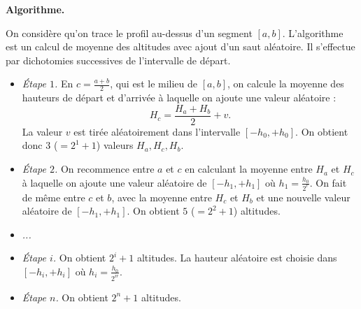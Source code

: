 \documentclass[11pt,class=report,crop=false]{standalone}
\begin{document}
\textbf{Algorithme.}

On considère qu'on trace le profil au-dessus d'un segment $[a,b]$.
L'algorithme est un calcul de moyenne des altitudes avec ajout d'un saut aléatoire.
Il s'effectue par dichotomies successives de l'intervalle de départ.

\begin{itemize}
  \item \emph{Étape $1$.} En $c=\frac{a+b}{2}$, qui est le milieu de $[a,b]$, on calcule la moyenne des hauteurs de départ et d'arrivée à laquelle on ajoute une valeur aléatoire :
$$H_c = \frac{H_a+H_b}{2} + v.$$
La valeur $v$ est tirée aléatoirement dans l'intervalle $[-h_0,+h_0]$.
On obtient donc $3$ ($=2^1+1$) valeurs $H_a,H_c,H_b$.



  \item \emph{Étape $2$.} On recommence entre $a$ et $c$ en calculant la moyenne entre $H_a$ et $H_c$ à laquelle on ajoute une valeur aléatoire de $[-h_1,+h_1]$ où $h_1 = \frac{h_0}{2^r}$. On fait de même entre $c$ et $b$, avec la moyenne entre $H_c$ et $H_b$ et une nouvelle valeur aléatoire de $[-h_1,+h_1]$. On obtient $5$ ($=2^2+1$) altitudes.




  \item \emph{...}
  \item \emph{Étape $i$.} On obtient $2^i+1$ altitudes. La hauteur aléatoire est choisie dans $[-h_i,+h_i]$ où $h_i = \frac{h_0}{2^{ir}}$.

  \item \emph{Étape $n$.} On obtient $2^n+1$ altitudes. 
\end{itemize}
\end{document}
